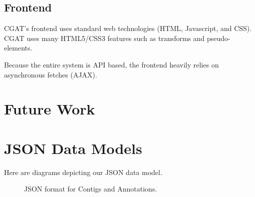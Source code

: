 \documentclass[10pt, conference, compsocconf]{IEEEtran}
\begin{document}
\subsection{Frontend}
CGAT's frontend uses standard web technologies (HTML, Javascript, and CSS).
CGAT uses many HTML5/CSS3 features such as transforms and pseudo-elements.

Because the entire system is API based, the frontend heavily relies on asynchronous fetches (AJAX).

\section{Future Work}\label{sec:future}






\onecolumn
\appendices

\section{JSON Data Models}\label{sec:data_models}
\centering
Here are diagrams depicting our JSON data model.

\begin{figure}[h]
   \centering
   \caption{JSON format for Contigs and Annotations.}
\end{figure}
\end{document}
